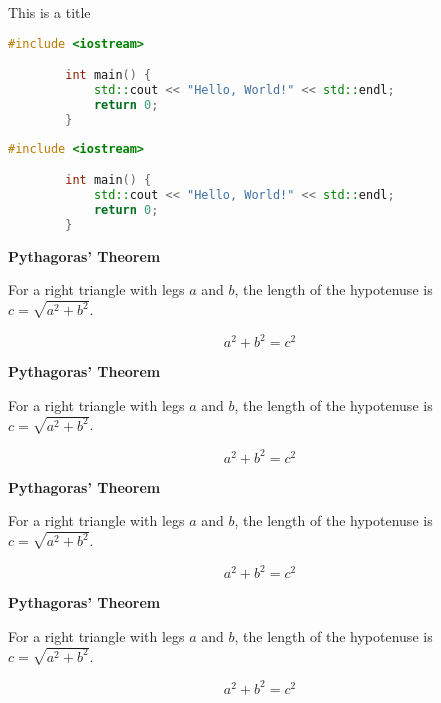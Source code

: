 \begin{codebox}{This is a title}
    \begin{lstlisting}[language=C++]
        #include <iostream>

        int main() {
            std::cout << "Hello, World!" << std::endl;
            return 0;
        }
    \end{lstlisting}
\end{codebox}

\begin{lstlisting}[language=C++]
        #include <iostream>

        int main() {
            std::cout << "Hello, World!" << std::endl;
            return 0;
        }
\end{lstlisting}

\begin{theorem}
    \textbf{Pythagoras' Theorem}

    For a right triangle with legs $a$ and $b$, the length of the hypotenuse is
    $c = \sqrt{a^2 + b^2}$.

    \begin{equation*}
        a^2 + b^2 = c^2
    \end{equation*}
\end{theorem}

\begin{lemma}
    \textbf{Pythagoras' Theorem}

    For a right triangle with legs $a$ and $b$, the length of the hypotenuse is
    $c = \sqrt{a^2 + b^2}$.

    \begin{equation*}
        a^2 + b^2 = c^2
    \end{equation*}
\end{lemma}

\begin{corollary}
    \textbf{Pythagoras' Theorem}

    For a right triangle with legs $a$ and $b$, the length of the hypotenuse is
    $c = \sqrt{a^2 + b^2}$.

    \begin{equation*}
        a^2 + b^2 = c^2
    \end{equation*}
\end{corollary}

\begin{proposition}
    \textbf{Pythagoras' Theorem}

    For a right triangle with legs $a$ and $b$, the length of the hypotenuse is
    $c = \sqrt{a^2 + b^2}$.

    \begin{equation*}
        a^2 + b^2 = c^2
    \end{equation*}
\end{proposition}

\nolinenumbers
